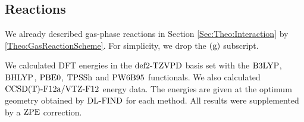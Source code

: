 \documentclass[8.5pt,twoside,twocolumn]{article}
\newcommand\zpe{\enmat{\te{ZPE}}}
\newcommand\dlfind{\enmat{\te{DL-FIND}}}
\theoremstyle{standard}
\begin{document}
\subsection{Reactions}
\label{Sec:Gas:Reaction}
We already described gas-phase reactions in Section \ref{Sec:Theo:Interaction}
by \eqref{Theo:GasReactionScheme}. For simplicity, we drop the $(\text g)$ subscript.

We calculated DFT energies in the $\text{def2-TZVPD}$ basis set with
the $\text{B3LYP}$, $\text{BHLYP}$, $\text{PBE0}$, $\text{TPSSh}$ and $\text{PW6B95}$ 
functionals. We also calculated $\text{CCSD(T)-F12a}/\text{VTZ-F}12$ energy data. The energies are
given at the optimum geometry obtained by $\dlfind$ for each method. All
results were supplemented by a $\zpe$ correction. 

\end{document}
